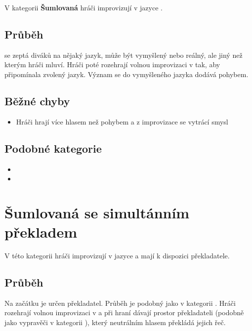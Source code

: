 \documentclass[main.tex]{subfiles}
\begin{document}
V kategorii \textbf{Šumlovaná}{} hráči improvizují v jazyce . 
 
\subsection{ Průběh }  se zeptá diváků na nějaký jazyk, může být vymyšlený nebo reálný, ale jiný než kterým hráči mluví. Hráči poté rozehrají volnou improvizaci v  tak, aby připomínala zvolený jazyk. Význam se do vymyšleného jazyka dodává pohybem. 
 
\subsection{ Běžné chyby } \begin{itemize}
\item  Hráči hrají více hlasem než pohybem a z improvizace se vytrácí smysl
\end{itemize}
 
\subsection{ Podobné kategorie } \begin{itemize}
\item  {}
\item  {}
\end{itemize}
 
 
 
 
\needspace{5cm} \section{Šumlovaná se simultánním překladem} \label{šumlovaná se simultánním překladem}  
 
V této kategorii hráči improvizují v jazyce  a mají k dispozici překladatele. 
 
\subsection{ Průběh } Na začátku je určen překladatel. Průběh je podobný jako v kategorii . Hráči rozehrají volnou improvizaci v  a při hraní dávají prostor překladateli (podobně jako vypravěči v kategorii ), který neutrálním hlasem překládá jejich řeč.  
 
\end{document}
